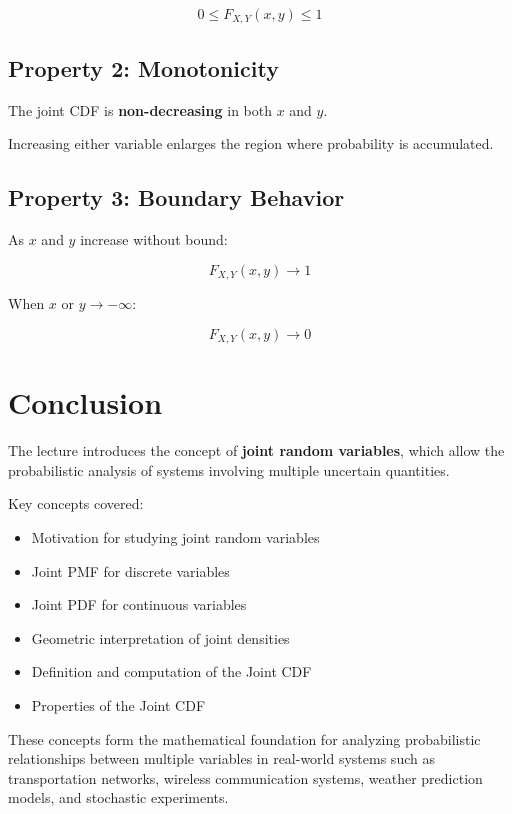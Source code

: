 \documentclass[12pt]{article}
\begin{document}
\[
0 \le F_{X,Y}(x,y) \le 1
\]

\subsection{Property 2: Monotonicity}

The joint CDF is \textbf{non-decreasing} in both $x$ and $y$.

Increasing either variable enlarges the region where probability is accumulated.

\subsection{Property 3: Boundary Behavior}

As $x$ and $y$ increase without bound:

\[
F_{X,Y}(x,y) \rightarrow 1
\]

When $x$ or $y \rightarrow -\infty$:

\[
F_{X,Y}(x,y) \rightarrow 0
\]

\section{Conclusion}

The lecture introduces the concept of \textbf{joint random variables}, which allow the probabilistic analysis of systems involving multiple uncertain quantities.

Key concepts covered:

\begin{itemize}
\item Motivation for studying joint random variables
\item Joint PMF for discrete variables
\item Joint PDF for continuous variables
\item Geometric interpretation of joint densities
\item Definition and computation of the Joint CDF
\item Properties of the Joint CDF
\end{itemize}

These concepts form the mathematical foundation for analyzing probabilistic relationships between multiple variables in real-world systems such as transportation networks, wireless communication systems, weather prediction models, and stochastic experiments.
\end{document}
